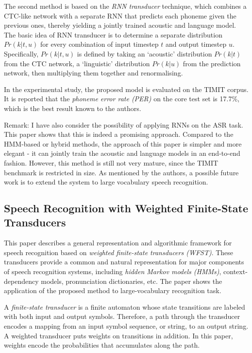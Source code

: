 \documentclass[paper=a4, fontsize=18pt]{article} %
\numberwithin{equation}{section} %
\numberwithin{figure}{section} %
\numberwithin{table}{section} %
\begin{document}
The second method is based on the \emph{RNN transducer} technique, which combines a CTC-like network with a separate RNN that predicts each phoneme given the previous ones, thereby yielding a jointly trained acoustic and language model. The basic idea of RNN transducer is to determine a separate distribution $Pr(k | t, u)$ for every combination of input timestep $t$ and output timestep $u$. Specifically, $Pr(k | t, u)$ is defined by taking an `acoustic' distribution $Pr(k | t)$ from the CTC network, a `linguistic' distribution $Pr(k | u)$ from the prediction network, then multiplying them together and renormalising.

In the experimental study, the proposed model is evaluated on the TIMIT corpus. It is reported that the \emph{phoneme error rate (PER)} on the core test set is 17.7\%, which is the best result known to the authors.

Remark: I have also consider the possibility of applying RNNs on the ASR task. This paper shows that this is indeed a promising approach. Compared to the HMM-based or hybrid methods, the approach of this paper is simpler and more elegant - it can jointly train the acoustic and language models in an end-to-end fashion. However, this method is still not very mature, since the TIMIT benchmark is restricted in size. As mentioned by the authors, a possible future work is to extend the system to large vocabulary speech recognition.

\subsection{Speech Recognition with Weighted Finite-State Transducers \cite{Mohri2000}}

This paper describes a general representation and algorithmic framework for speech recognition based on \emph{weighted finite-state transducers (WFST)}. These transducers provide a common and natural representation for major components of speech recognition systems, including \emph{hidden Markov models (HMMs)}, context-dependency models, pronunciation dictionaries, etc. The paper shows the application of the proposed method to large-vocabulary recognition task.

A \emph{finite-state transducer} is a finite automaton whose state transitions are labeled with both input and output symbols. Therefore, a path through the transducer encodes a mapping from an input symbol sequence, or string, to an output string. A weighted transducer puts weights on transitions in addition. In this paper, weights encode the probabilities that accumulates along the path.
\end{document}

